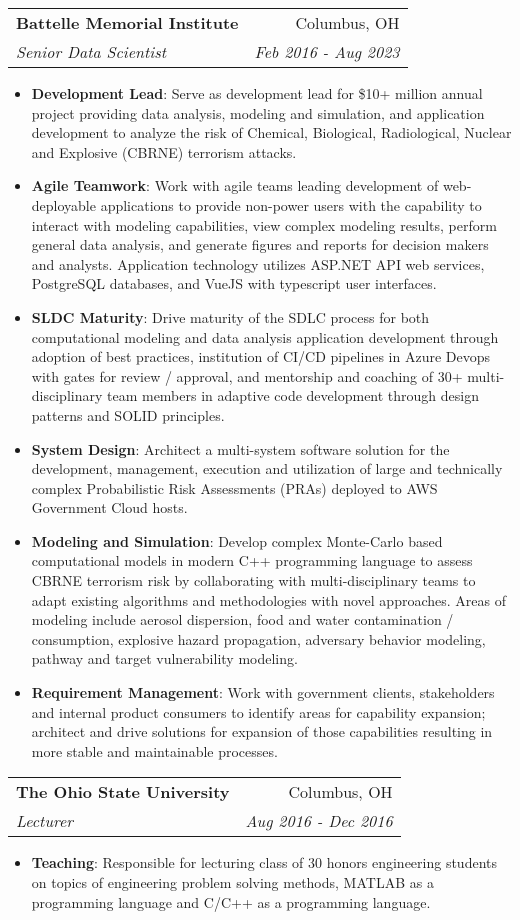 \documentclass[letterpaper,11pt]{article}
\makeatletter
\newcommand{\resumeItem}[2]{
  \item\small{
    \textbf{#1}{: #2 \vspace{-2pt}}
  }
}
\newcommand{\resumeSubheading}[4]{
  \vspace{-1pt}\item
    \begin{tabular*}{0.97\textwidth}[t]{l@{\extracolsep{\fill}}r}
      \textbf{#1} & #2 \\
      \textit{\small#3} & \textit{\small #4} \\
    \end{tabular*}\vspace{-5pt}
}
\newcommand{\resumeItemListStart}{\begin{itemize}}
\newcommand{\resumeItemListEnd}{\end{itemize}\vspace{-5pt}}
\makeatother
\begin{document}
    \resumeSubheading
      {Battelle Memorial Institute}{Columbus, OH}
      {Senior Data Scientist}{Feb 2016 - Aug 2023}
      \resumeItemListStart
        \resumeItem{Development Lead}
          {Serve as development lead for \$10+ million annual project providing data analysis, modeling and simulation, and application development to analyze the risk of Chemical, Biological, Radiological, Nuclear and Explosive (CBRNE) terrorism attacks.}
        \resumeItem{Agile Teamwork}
          {Work with agile teams leading development of web-deployable applications to provide non-power users with the capability to interact with modeling capabilities, view complex modeling results, perform general data analysis, and generate figures and reports for decision makers and analysts. Application technology utilizes ASP.NET API web services, PostgreSQL databases, and VueJS with typescript user interfaces. }
        \resumeItem{SLDC Maturity}
          {Drive maturity of the SDLC process for both computational modeling and data analysis application development through adoption of best practices, institution of CI/CD pipelines in Azure Devops with gates for review / approval, and mentorship and coaching of 30+ multi-disciplinary team members in adaptive code development through design patterns and SOLID principles.}
        \resumeItem{System Design}
          {Architect a multi-system software solution for the development, management, execution and utilization of large and technically complex Probabilistic Risk Assessments (PRAs) deployed to AWS Government Cloud hosts.}
        \resumeItem{Modeling and Simulation}
          {Develop complex Monte-Carlo based computational models in modern C++ programming language to assess CBRNE terrorism risk by collaborating with multi-disciplinary teams to adapt existing algorithms and methodologies with novel approaches. Areas of modeling include aerosol dispersion, food and water contamination / consumption, explosive hazard propagation, adversary behavior modeling, pathway and target vulnerability modeling.}
        \resumeItem{Requirement Management}
          {Work with government clients, stakeholders and internal product consumers to identify areas for capability expansion; architect and drive solutions for expansion of those capabilities resulting in more stable and maintainable processes.}
      \resumeItemListEnd

    \resumeSubheading
      {The Ohio State University}{Columbus, OH}
      {Lecturer}{Aug 2016 - Dec 2016}
      \resumeItemListStart
        \resumeItem{Teaching}
          {Responsible for lecturing class of 30 honors engineering students on topics of engineering problem solving methods, MATLAB as a programming language and C/C++ as a programming language.}
      \resumeItemListEnd
\end{document}
